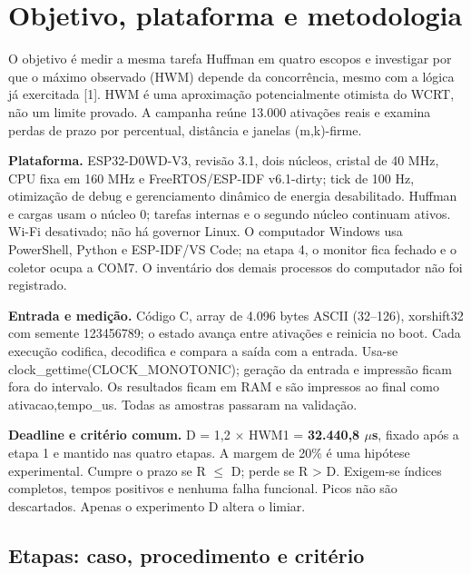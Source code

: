
\section{Objetivo, plataforma e metodologia}

O objetivo é medir a mesma tarefa Huffman em quatro escopos e investigar por que o máximo observado (HWM) depende da concorrência, mesmo com a lógica já exercitada [1]. HWM é uma aproximação potencialmente otimista do WCRT, não um limite provado. A campanha reúne 13.000 ativações reais e examina perdas de prazo por percentual, distância e janelas (m,k)-firme.
\par

\textbf{Plataforma.} ESP32-D0WD-V3, revisão 3.1, dois núcleos, cristal de 40 MHz, CPU fixa em 160 MHz e FreeRTOS/ESP-IDF v6.1-dirty; tick de 100 Hz, otimização de debug e gerenciamento dinâmico de energia desabilitado. Huffman e cargas usam o núcleo 0; tarefas internas e o segundo núcleo continuam ativos. Wi-Fi desativado; não há governor Linux. O computador Windows usa PowerShell, Python e ESP-IDF/VS Code; na etapa 4, o monitor fica fechado e o coletor ocupa a COM7. O inventário dos demais processos do computador não foi registrado.
\par

\textbf{Entrada e medição.} Código C, array de 4.096 bytes ASCII (32--126), xorshift32 com semente 123456789; o estado avança entre ativações e reinicia no boot. Cada execução codifica, decodifica e compara a saída com a entrada. Usa-se clock\_gettime(CLOCK\_MONOTONIC); geração da entrada e impressão ficam fora do intervalo. Os resultados ficam em RAM e são impressos ao final como ativacao,tempo\_us. Todas as amostras passaram na validação.
\par

\textbf{Deadline e critério comum.} D = 1,2 \ensuremath{\times} HWM1 = \textbf{32.440,8 \ensuremath{\mu}s}, fixado após a etapa 1 e mantido nas quatro etapas. A margem de 20\% é uma hipótese experimental. Cumpre o prazo se R \ensuremath{\leq} D; perde se R > D. Exigem-se índices completos, tempos positivos e nenhuma falha funcional. Picos não são descartados. Apenas o experimento D altera o limiar.
\par

\subsection{Etapas: caso, procedimento e critério}


